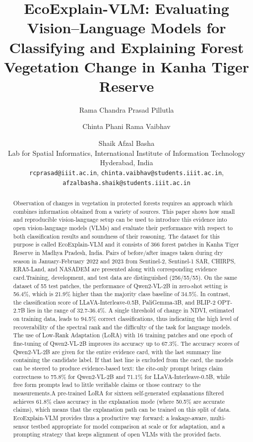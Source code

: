 \documentclass[11pt]{article}
\title{EcoExplain-VLM: Evaluating Vision--Language Models for Classifying
and Explaining Forest Vegetation Change in Kanha Tiger Reserve}
\author{
  Rama Chandra Prasad Pillutla \and
  Chinta Phani Rama Vaibhav \and
  Shaik Afzal Basha \\
  Lab for Spatial Informatics, International Institute of Information Technology Hyderabad, India \\
  \texttt{rcprasad@iiit.ac.in}, \texttt{chinta.vaibhav@students.iiit.ac.in}, \\
  \texttt{afzalbasha.shaik@students.iiit.ac.in}
}
\begin{document}
\maketitle


\begin{abstract}
Observation of changes in vegetation in protected forests requires an approach which combines information obtained from a variety of sources. This paper shows how small and reproducible vision-language setup can be used to introduce this evidence into open vision-language models (VLMs) and evaluate their performance with respect to both classification results and soundness of their reasoning. The dataset for this purpose is called EcoExplain-VLM and it consists of 366 forest patches in Kanha Tiger Reserve in Madhya Pradesh, India. Pairs of before/after images taken during dry season in January-February 2022 and 2023 from Sentinel-2, Sentinel-1 SAR, CHIRPS, ERA5-Land, and NASADEM are presented along with corresponding evidence card.Training, development, and test data are distinguished (256/55/55). On the same dataset of 55 test patches, the performance of Qwen2-VL-2B in zero-shot setting is 56.4\%, which is 21.9\% higher than the majority class baseline of 34.5\%. In contrast, the classification score of LLaVA-Interleave-0.5B, PaliGemma-3B, and BLIP-2 OPT-2.7B lies in the range of 32.7-36.4\%. A single threshold of change in NDVI, estimated on training data, leads to 94.5\% correct classifications, thus indicating the high level of recoverability of the spectral rank and the difficulty of the task for language models. The use of Low-Rank Adaptation (LoRA) with 16 training patches and one epoch of fine-tuning of Qwen2-VL-2B improves its accuracy up to 67.3\%. The accuracy scores of Qwen2-VL-2B are given for the entire evidence card, with the last summary line containing the candidate label. If that last line is excluded from the card, the models can be steered to produce evidence-based text: the cite-only prompt brings claim correctness to 75.8\% for Qwen2-VL-2B and 71.1\% for LLaVA-Interleave-0.5B, while free form prompts lead to little verifiable claims or those contrary to the measurements.A pre-trained LoRA for sixteen self-generated explanations filtered achieves 61.8\% class accuracy in the explanation mode (where 50.5\% are accurate claims), which means that the explanation path can be trained on this split of data. EcoExplain-VLM provides thus a productive way forward: a leakage-aware, multi-sensor testbed appropriate for model comparison at scale or for adaptation, and a prompting strategy that keeps alignment of open VLMs with the provided facts.
\end{abstract}
\end{document}
